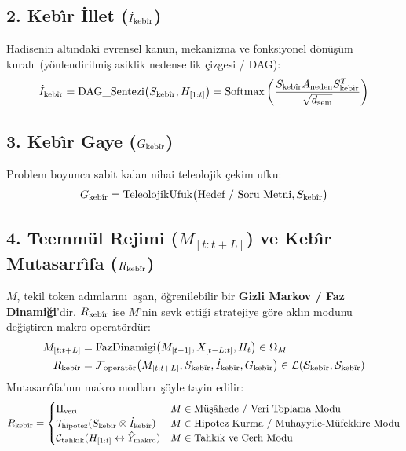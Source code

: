 \documentclass[11pt,a4paper]{article}
\begin{document}
\subsection{2. Keb\^{\i}r \.Illet ($\dot{I}_{\text{keb\^{\i}r}}$)}
Hadisenin alt\i ndaki evrensel kanun, mekanizma ve fonksiyonel d\"on\"u\c{s}\"um kural\i\ (y\"onlendirilmi\c{s} asiklik nedensellik \c{c}izgesi / DAG):
\begin{equation}
\dot{I}_{\text{keb\^{\i}r}} = \text{DAG\_Sentezi}\big(S_{\text{keb\^{\i}r}}, H_{[1:t]}\big) = \text{Softmax}\left(\frac{S_{\text{keb\^{\i}r}} A_{\text{neden}} S_{\text{keb\^{\i}r}}^T}{\sqrt{d_{\text{sem}}}}\right)
\end{equation}

\subsection{3. Keb\^{\i}r Gaye ($G_{\text{keb\^{\i}r}}$)}
Problem boyunca sabit kalan nihai teleolojik \c{c}ekim ufku:
\begin{equation}
G_{\text{keb\^{\i}r}} = \text{TeleolojikUfuk}\big(\text{Hedef / Soru Metni}, S_{\text{keb\^{\i}r}}\big)
\end{equation}

\subsection{4. Teemm\"ul Rejimi ($M_{[t:t+L]}$) ve Keb\^{\i}r Mutasarr\^{\i}fa ($R_{\text{keb\^{\i}r}}$)}
$M$, tekil token ad\i mlar\i n\i\ a\c{s}an, \"o\u{g}renilebilir bir \textbf{Gizli Markov / Faz Dinami\u{g}i}'dir. $R_{\text{keb\^{\i}r}}$ ise $M$'nin sevk etti\u{g}i stratejiye g\"ore akl\i n modunu de\u{g}i\c{s}tiren makro operat\"ord\"ur:
\begin{align}
M_{[t:t+L]} &= \text{FazDinamigi}\big(M_{[t-1]}, X_{[t-L:t]}, H_t\big) \in \Omega_M \\
R_{\text{keb\^{\i}r}} &= \mathcal{F}_{\text{operat\"or}}\big(M_{[t:t+L]}, S_{\text{keb\^{\i}r}}, \dot{I}_{\text{keb\^{\i}r}}, G_{\text{keb\^{\i}r}}\big) \in \mathcal{L}(\mathcal{S}_{\text{keb\^{\i}r}}, \mathcal{S}_{\text{keb\^{\i}r}})
\end{align}
Mutasarr\^{\i}fa'n\i n makro modlar\i\ \c{s}\"oyle tayin edilir:
\begin{equation}
R_{\text{keb\^{\i}r}} = 
\begin{cases}
\Pi_{\text{veri}} & M \in \text{M\"u\c{s}\^{a}hede / Veri Toplama Modu} \\
\mathcal{T}_{\text{hipotez}}(S_{\text{keb\^{\i}r}} \otimes \dot{I}_{\text{keb\^{\i}r}}) & M \in \text{Hipotez Kurma / Muhayyile-M\"ufekkire Modu} \\
\mathcal{C}_{\text{tahkik}}(H_{[1:t]} \leftrightarrow \hat{Y}_{\text{makro}}) & M \in \text{Tahkik ve Cerh Modu}
\end{cases}
\end{equation}
\end{document}
